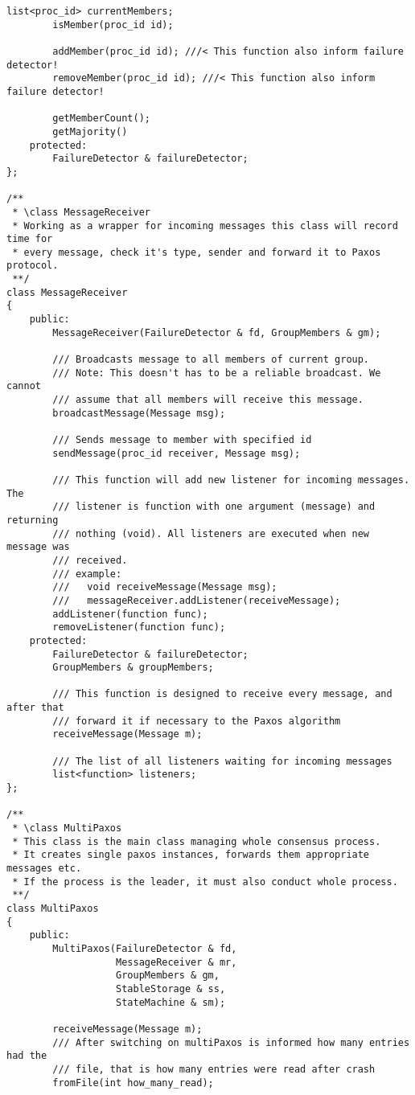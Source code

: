 \begin{lstlisting}[frame=lines,caption=Pseudocode of Paxos algorithm]
		list<proc_id> currentMembers;
		isMember(proc_id id);

		addMember(proc_id id); ///< This function also inform failure detector!
		removeMember(proc_id id); ///< This function also inform failure detector!

		getMemberCount();
		getMajority()
	protected:
		FailureDetector & failureDetector;
};

/**
 * \class MessageReceiver
 * Working as a wrapper for incoming messages this class will record time for 
 * every message, check it's type, sender and forward it to Paxos protocol.
 **/
class MessageReceiver
{
	public:
		MessageReceiver(FailureDetector & fd, GroupMembers & gm);
		
		/// Broadcasts message to all members of current group.
		/// Note: This doesn't has to be a reliable broadcast. We cannot
		/// assume that all members will receive this message.
		broadcastMessage(Message msg);
		
		/// Sends message to member with specified id
		sendMessage(proc_id receiver, Message msg);
		
		/// This function will add new listener for incoming messages. The 
		/// listener is function with one argument (message) and returning 
		/// nothing (void). All listeners are executed when new message was
		/// received.
		/// example:
		///   void receiveMessage(Message msg);
		///   messageReceiver.addListener(receiveMessage);
		addListener(function func);
		removeListener(function func);
	protected:
		FailureDetector & failureDetector;
		GroupMembers & groupMembers;
	
		/// This function is designed to receive every message, and after that
		/// forward it if necessary to the Paxos algorithm
		receiveMessage(Message m);
		
		/// The list of all listeners waiting for incoming messages
		list<function> listeners;
};

/**
 * \class MultiPaxos
 * This class is the main class managing whole consensus process.
 * It creates single paxos instances, forwards them appropriate messages etc.
 * If the process is the leader, it must also conduct whole process.
 **/
class MultiPaxos
{
	public:
		MultiPaxos(FailureDetector & fd,
				   MessageReceiver & mr,
				   GroupMembers & gm,
				   StableStorage & ss,
				   StateMachine & sm);
	
		receiveMessage(Message m);
		/// After switching on multiPaxos is informed how many entries had the
		/// file, that is how many entries were read after crash
		fromFile(int how_many_read);
		

\end{lstlisting}
